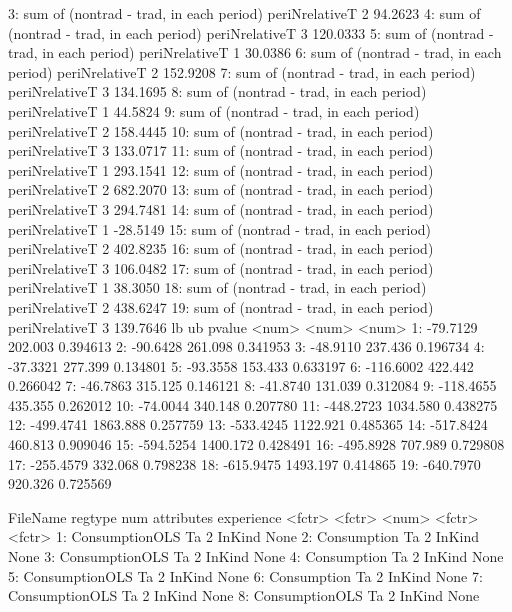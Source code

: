 \begin{Schunk}
\begin{Soutput}
 3: sum of (nontrad - trad, in each period) periNrelativeT      2  94.2623
 4: sum of (nontrad - trad, in each period) periNrelativeT      3 120.0333
 5: sum of (nontrad - trad, in each period) periNrelativeT      1  30.0386
 6: sum of (nontrad - trad, in each period) periNrelativeT      2 152.9208
 7: sum of (nontrad - trad, in each period) periNrelativeT      3 134.1695
 8: sum of (nontrad - trad, in each period) periNrelativeT      1  44.5824
 9: sum of (nontrad - trad, in each period) periNrelativeT      2 158.4445
10: sum of (nontrad - trad, in each period) periNrelativeT      3 133.0717
11: sum of (nontrad - trad, in each period) periNrelativeT      1 293.1541
12: sum of (nontrad - trad, in each period) periNrelativeT      2 682.2070
13: sum of (nontrad - trad, in each period) periNrelativeT      3 294.7481
14: sum of (nontrad - trad, in each period) periNrelativeT      1 -28.5149
15: sum of (nontrad - trad, in each period) periNrelativeT      2 402.8235
16: sum of (nontrad - trad, in each period) periNrelativeT      3 106.0482
17: sum of (nontrad - trad, in each period) periNrelativeT      1  38.3050
18: sum of (nontrad - trad, in each period) periNrelativeT      2 438.6247
19: sum of (nontrad - trad, in each period) periNrelativeT      3 139.7646
           lb       ub   pvalue
        <num>    <num>    <num>
 1:  -79.7129  202.003 0.394613
 2:  -90.6428  261.098 0.341953
 3:  -48.9110  237.436 0.196734
 4:  -37.3321  277.399 0.134801
 5:  -93.3558  153.433 0.633197
 6: -116.6002  422.442 0.266042
 7:  -46.7863  315.125 0.146121
 8:  -41.8740  131.039 0.312084
 9: -118.4655  435.355 0.262012
10:  -74.0044  340.148 0.207780
11: -448.2723 1034.580 0.438275
12: -499.4741 1863.888 0.257759
13: -533.4245 1122.921 0.485365
14: -517.8424  460.813 0.909046
15: -594.5254 1400.172 0.428491
16: -495.8928  707.989 0.729808
17: -255.4579  332.068 0.798238
18: -615.9475 1493.197 0.414865
19: -640.7970  920.326 0.725569
\end{Soutput}
\begin{Soutput}
          FileName regtype   num attributes experience
            <fctr>  <fctr> <num>     <fctr>     <fctr>
 1: ConsumptionOLS      Ta     2     InKind       None
 2:    Consumption      Ta     2     InKind       None
 3: ConsumptionOLS      Ta     2     InKind       None
 4:    Consumption      Ta     2     InKind       None
 5: ConsumptionOLS      Ta     2     InKind       None
 6:    Consumption      Ta     2     InKind       None
 7: ConsumptionOLS      Ta     2     InKind       None
 8: ConsumptionOLS      Ta     2     InKind       None

\end{Soutput}
\end{Schunk}
